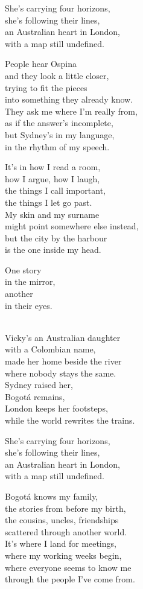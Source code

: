 \begin{lyrics}
She's carrying four horizons,\\
she's following their lines,\\
an Australian heart in London,\\
with a map still undefined.

People hear Ospina\\
and they look a little closer,\\
trying to fit the pieces\\
into something they already know.\\
They ask me where I'm really from,\\
as if the answer's incomplete,\\
but Sydney's in my language,\\
in the rhythm of my speech.

It's in how I read a room,\\
how I argue, how I laugh,\\
the things I call important,\\
the things I let go past.\\
My skin and my surname\\
might point somewhere else instead,\\
but the city by the harbour\\
is the one inside my head.

One story\\
in the mirror,\\
another\\
in their eyes.

\\
Vicky's an Australian daughter\\
with a Colombian name,\\
made her home beside the river\\
where nobody stays the same.\\
Sydney raised her,\\
Bogotá remains,\\
London keeps her footsteps,\\
while the world rewrites the trains.

She's carrying four horizons,\\
she's following their lines,\\
an Australian heart in London,\\
with a map still undefined.

Bogotá knows my family,\\
the stories from before my birth,\\
the cousins, uncles, friendships\\
scattered through another world.\\
It's where I land for meetings,\\
where my working weeks begin,\\
where everyone seems to know me\\
through the people I've come from.


\end{lyrics}
